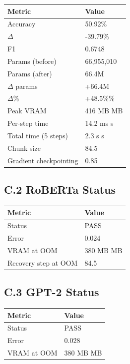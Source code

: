 \begin{table}[H]
\centering
\small
\begin{tabular}{ll}
\toprule
\textbf{Metric} & \textbf{Value} \\
\midrule
Accuracy & 50.92\% \\
$\Delta$ & -39.79\% \\
F1 & 0.6748 \\
Params (before) & 66,955,010 \\
Params (after) & 66.4M \\
$\Delta$ params & +66.4M \\
$\Delta$\% & +48.5\%\% \\
Peak VRAM & 416 MB MB \\
Per-step time & 14.2 ms s \\
Total time (5 steps) & 2.3 s s \\
Chunk size & 84.5 \\
Gradient checkpointing & 0.85 \\
\bottomrule
\end{tabular}
\end{table}

\subsection{C.2 RoBERTa Status}

\begin{table}[H]
\centering
\small
\begin{tabular}{ll}
\toprule
\textbf{Metric} & \textbf{Value} \\
\midrule
Status & PASS \\
Error & 0.024 \\
VRAM at OOM & 380 MB MB \\
Recovery step at OOM & 84.5 \\
\bottomrule
\end{tabular}
\end{table}

\subsection{C.3 GPT-2 Status}

\begin{table}[H]
\centering
\small
\begin{tabular}{ll}
\toprule
\textbf{Metric} & \textbf{Value} \\
\midrule
Status & PASS \\
Error & 0.028 \\
VRAM at OOM & 380 MB MB \\
\bottomrule
\end{tabular}
\end{table}


